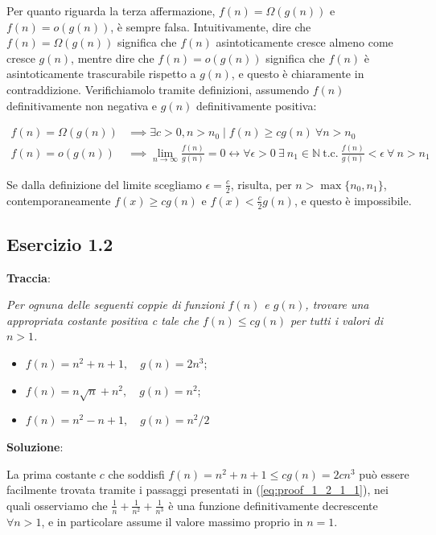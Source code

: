 \documentclass{article}
\begin{document}
\vspace{\baselineskip}
\noindent
Per quanto riguarda la terza affermazione, $ f(n) = \Omega(g(n))$ e $f(n) = o(g(n))$, è sempre falsa. Intuitivamente, dire che $ f(n) = \Omega(g(n))$ significa che $f(n)$ asintoticamente cresce almeno come cresce $g(n)$, mentre dire che $f(n) = o(g(n))$ significa che $f(n)$ è asintoticamente trascurabile rispetto a $g(n)$, e questo è chiaramente in contraddizione. Verifichiamolo tramite definizioni, assumendo $f(n)$ definitivamente non negativa e $g(n)$ definitivamente positiva:

\begin{equation} \label{eq:proof_1_1_3_1}
\begin{aligned}
f(n) = \Omega(g(n)) &\implies \exists  c>0, n>n_0 \; | \; f(n) \ge cg(n) \ \forall n>n_0 \\
f(n) = o(g(n)) & \implies \lim_{n \to \infty} \frac{f(n)}{g(n)} = 0 \leftrightarrow \forall \epsilon>0 \ \exists \ n_1 \in \mathbb{N} \ \text{t.c.} \ \frac{f(n)}{g(n)} < \epsilon \ \forall \ n>n_1
\end{aligned}
\end{equation}

\noindent
Se dalla definizione del limite scegliamo $\epsilon = \frac{c}{2}$, risulta, per $n > \max\{n_0,n_1\}$, contemporaneamente $f(x) \ge cg(n)$ e $f(x) < \frac{c}{2}g(n)$, e questo è impossibile. 

\subsection{Esercizio 1.2} \label{subsec:esercizio1_2}
\textbf{Traccia}:

\noindent
\textit{Per ognuna delle seguenti coppie di funzioni $f(n)$ e $g(n)$, trovare una appropriata costante positiva c tale che $f(n) \le cg(n)$  per tutti i valori di $n > 1$.}
\begin{itemize}
    \item $f(n) = n^2 + n + 1, \quad g(n) = 2n^3$;
    \item $f(n) = n\sqrt{n} + n^2, \quad g(n) = n^2 $;
    \item $ f(n) = n^2 - n + 1, \quad g(n) = n^2/2 $
\end{itemize}
\vspace{\baselineskip}

\noindent
\textbf{Soluzione}: 

\noindent
La prima costante $c$ che soddisfi $f(n) = n^2 + n + 1 \le cg(n) = 2cn^3$ può essere facilmente trovata tramite i passaggi presentati in (\ref{eq:proof_1_2_1_1}), nei quali osserviamo che $\frac{1}{n} + \frac{1}{n^2} + \frac{1}{n^3}$ è una funzione definitivamente decrescente $\forall n>1$, e in particolare assume il valore massimo proprio in $n=1$.
\end{document}
